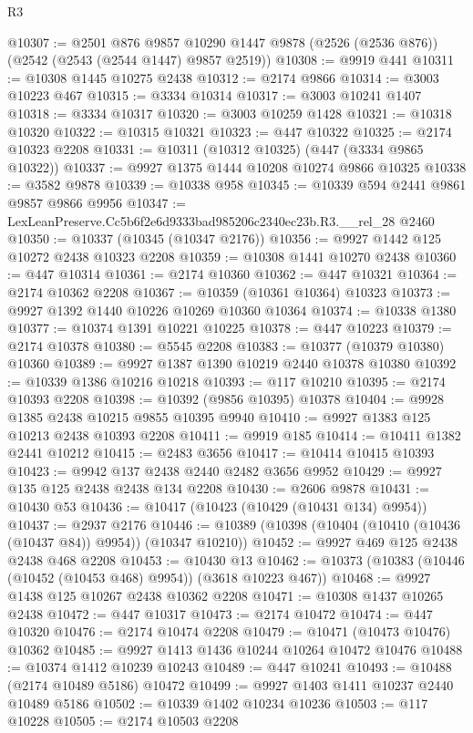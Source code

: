 \begin{lexlean}{R3}
\begin{coremodule}
@10307 := @2501
    @876
    @9857
    @10290
    @1447
    @9878
    (@2526 (@2536 @876))
    (@2542 (@2543 (@2544 @1447) @9857 @2519))
@10308 := @9919 @441
@10311 := @10308 @1445 @10275 @2438
@10312 := @2174 @9866
@10314 := @3003 @10223 @467
@10315 := @3334 @10314
@10317 := @3003 @10241 @1407
@10318 := @3334 @10317
@10320 := @3003 @10259 @1428
@10321 := @10318 @10320
@10322 := @10315 @10321
@10323 := @447 @10322
@10325 := @2174 @10323 @2208
@10331 := @10311 (@10312 @10325) (@447 (@3334 @9865 @10322))
@10337 := @9927 @1375 @1444 @10208 @10274 @9866 @10325
@10338 := @3582 @9878
@10339 := @10338 @958
@10345 := @10339 @594 @2441 @9861 @9857 @9866 @9956
@10347 := LexLeanPreserve.Cc5b6f2e6d9333bad985206c2340ec23b.R3.__rel_28 @2460
@10350 := @10337 (@10345 (@10347 @2176))
@10356 := @9927 @1442 @125 @10272 @2438 @10323 @2208
@10359 := @10308 @1441 @10270 @2438
@10360 := @447 @10314
@10361 := @2174 @10360
@10362 := @447 @10321
@10364 := @2174 @10362 @2208
@10367 := @10359 (@10361 @10364) @10323
@10373 := @9927 @1392 @1440 @10226 @10269 @10360 @10364
@10374 := @10338 @1380
@10377 := @10374 @1391 @10221 @10225
@10378 := @447 @10223
@10379 := @2174 @10378
@10380 := @5545 @2208
@10383 := @10377 (@10379 @10380) @10360
@10389 := @9927 @1387 @1390 @10219 @2440 @10378 @10380
@10392 := @10339 @1386 @10216 @10218
@10393 := @117 @10210
@10395 := @2174 @10393 @2208
@10398 := @10392 (@9856 @10395) @10378
@10404 := @9928 @1385 @2438 @10215 @9855 @10395 @9940
@10410 := @9927 @1383 @125 @10213 @2438 @10393 @2208
@10411 := @9919 @185
@10414 := @10411 @1382 @2441 @10212
@10415 := @2483 @3656
@10417 := @10414 @10415 @10393
@10423 := @9942 @137 @2438 @2440 @2482 @3656 @9952
@10429 := @9927 @135 @125 @2438 @2438 @134 @2208
@10430 := @2606 @9878
@10431 := @10430 @53
@10436 := @10417 (@10423 (@10429 (@10431 @134) @9954))
@10437 := @2937 @2176
@10446 := @10389 (@10398 (@10404 (@10410 (@10436 (@10437 @84)) @9954)) (@10347 @10210))
@10452 := @9927 @469 @125 @2438 @2438 @468 @2208
@10453 := @10430 @13
@10462 := @10373 (@10383 (@10446 (@10452 (@10453 @468) @9954)) (@3618 @10223 @467))
@10468 := @9927 @1438 @125 @10267 @2438 @10362 @2208
@10471 := @10308 @1437 @10265 @2438
@10472 := @447 @10317
@10473 := @2174 @10472
@10474 := @447 @10320
@10476 := @2174 @10474 @2208
@10479 := @10471 (@10473 @10476) @10362
@10485 := @9927 @1413 @1436 @10244 @10264 @10472 @10476
@10488 := @10374 @1412 @10239 @10243
@10489 := @447 @10241
@10493 := @10488 (@2174 @10489 @5186) @10472
@10499 := @9927 @1403 @1411 @10237 @2440 @10489 @5186
@10502 := @10339 @1402 @10234 @10236
@10503 := @117 @10228
@10505 := @2174 @10503 @2208

\end{coremodule}
\end{lexlean}
